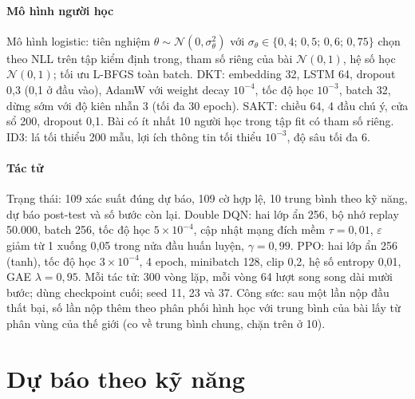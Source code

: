 \documentclass[a4paper,preprint,12pt,authoryear]{elsarticle}
\begin{document}
\paragraph{Mô hình người học} Mô hình logistic: tiên nghiệm $\theta\sim\mathcal N(0,\sigma_\theta^2)$ với $\sigma_\theta\in\{0{,}4;\,0{,}5;\,0{,}6;\,0{,}75\}$ chọn theo NLL trên tập kiểm định trong, tham số riêng của bài $\mathcal N(0,1)$, hệ số học $\mathcal N(0,1)$; tối ưu L-BFGS toàn batch. DKT: embedding 32, LSTM 64, dropout 0,3 (0,1 ở đầu vào), AdamW với weight decay $10^{-4}$, tốc độ học $10^{-3}$, batch 32, dừng sớm với độ kiên nhẫn 3 (tối đa 30 epoch). SAKT: chiều 64, 4 đầu chú ý, cửa sổ 200, dropout 0,1. Bài có ít nhất 10 người học trong tập fit có tham số riêng. ID3: lá tối thiểu 200 mẫu, lợi ích thông tin tối thiểu $10^{-3}$, độ sâu tối đa 6.

\paragraph{Tác tử} Trạng thái: 109 xác suất đúng dự báo, 109 cờ hợp lệ, 10 trung bình theo kỹ năng, dự báo post-test và số bước còn lại. Double DQN: hai lớp ẩn 256, bộ nhớ replay 50.000, batch 256, tốc độ học $5\times10^{-4}$, cập nhật mạng đích mềm $\tau=0{,}01$, $\varepsilon$ giảm từ 1 xuống 0,05 trong nửa đầu huấn luyện, $\gamma=0{,}99$. PPO: hai lớp ẩn 256 (tanh), tốc độ học $3\times10^{-4}$, 4 epoch, minibatch 128, clip 0,2, hệ số entropy 0,01, GAE $\lambda=0{,}95$. Mỗi tác tử: 300 vòng lặp, mỗi vòng 64 lượt song song dài mười bước; dùng checkpoint cuối; seed 11, 23 và 37. Công sức: sau một lần nộp đầu thất bại, số lần nộp thêm theo phân phối hình học với trung bình của bài lấy từ phân vùng của thế giới (co về trung bình chung, chặn trên ở 10).

\section{Dự báo theo kỹ năng}\label{app:skills}
\end{document}
